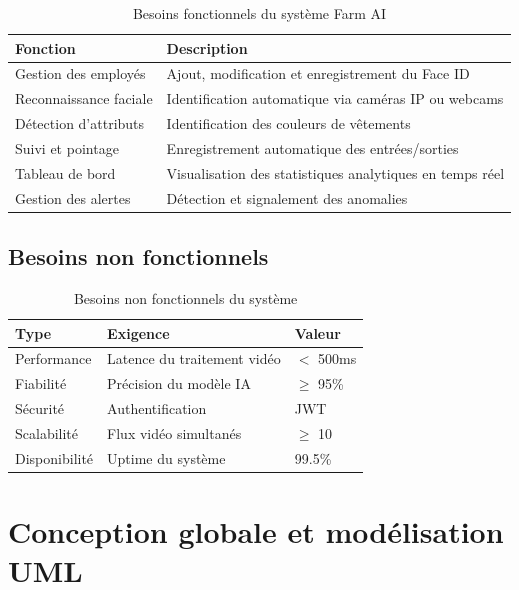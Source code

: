 \documentclass[12pt,a4paper]{report}
\newcommand{\tableheader}[1]{
  \cellcolor[gray]{0.8}%
  \bfseries#1%
}
\numberwithin{figure}{chapter}
\numberwithin{table}{chapter}
\begin{document}
\begin{table}[H]
  \centering
  \caption{Besoins fonctionnels du système Farm AI}
  \label{tab:besoins_fonctionnels}
  \begin{tabularx}{\textwidth}{|l|X|}
    \hline
    \tableheader{Fonction} & \tableheader{Description} \\
    \hline
    Gestion des employés & Ajout, modification et enregistrement du Face ID \\
    \hline
    Reconnaissance faciale & Identification automatique via caméras IP ou webcams \\
    \hline
    Détection d'attributs & Identification des couleurs de vêtements \\
    \hline
    Suivi et pointage & Enregistrement automatique des entrées/sorties \\
    \hline
    Tableau de bord & Visualisation des statistiques analytiques en temps réel \\
    \hline
    Gestion des alertes & Détection et signalement des anomalies \\
    \hline
  \end{tabularx}
\end{table}

\subsection{Besoins non fonctionnels}

\begin{table}[H]
  \centering
  \caption{Besoins non fonctionnels du système}
  \label{tab:besoins_nf}
  \begin{tabularx}{\textwidth}{|l|X|l|}
    \hline
    \tableheader{Type} & \tableheader{Exigence} & \tableheader{Valeur} \\
    \hline
    Performance & Latence du traitement vidéo & $<$ 500ms \\
    \hline
    Fiabilité & Précision du modèle IA & $\geq$ 95\% \\
    \hline
    Sécurité & Authentification & JWT \\
    \hline
    Scalabilité & Flux vidéo simultanés & $\geq$ 10 \\
    \hline
    Disponibilité & Uptime du système & 99.5\% \\
    \hline
  \end{tabularx}
\end{table}

\section{Conception globale et modélisation UML}
\end{document}
